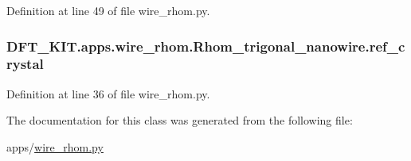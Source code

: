 Definition at line 49 of file wire\+\_\+rhom.\+py.

\hypertarget{class_d_f_t___k_i_t_1_1apps_1_1wire__rhom_1_1_rhom__trigonal__nanowire_a24be6451c8eea10c855b4894e7319e82}{
\subsubsection[{ref\+\_\+crystal}]{\setlength{\rightskip}{0pt plus 5cm}D\+F\+T\+\_\+\+K\+I\+T.\+apps.\+wire\+\_\+rhom.\+Rhom\+\_\+trigonal\+\_\+nanowire.\+ref\+\_\+crystal}}\label{class_d_f_t___k_i_t_1_1apps_1_1wire__rhom_1_1_rhom__trigonal__nanowire_a24be6451c8eea10c855b4894e7319e82}


Definition at line 36 of file wire\+\_\+rhom.\+py.



The documentation for this class was generated from the following file\+:\begin{DoxyCompactItemize}
\item 
apps/\hyperlink{wire__rhom_8py}{wire\+\_\+rhom.\+py}\end{DoxyCompactItemize}

